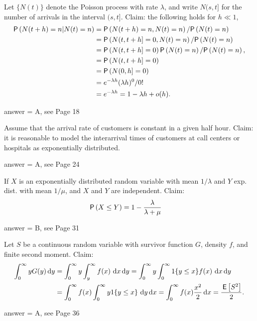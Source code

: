 \begin{exercise}[201807]{1}
Let $\{N(t)\}$ denote the Poisson process with rate $\lambda$, and write $N(s, t]$ for the number of arrivals in the interval $(s,t]$. Claim:  the following holds for $h\ll 1$, 
    \begin{align*}
  \P{N(t+h) = n | N(t) = n} 
&=  \P{N(t+h) = n, N(t) = n}/\P{N(t)=n} \\
&=  \P{N(t, t+h] = 0,  N(t) = n}/\P{N(t)=n} \\
&=  \P{N(t, t+h] = 0} \P{N(t) = n}/\P{N(t)=n}, \\
&= \P{N(t, t+h] = 0} \\
&= \P{N(0, h] = 0} \\
&= e^{-\lambda h} (\lambda h)^0/0! \\
&= e^{-\lambda h} = 1-\lambda h + o(h).
    \end{align*}
\begin{solution}
answer = A, see Page 18
\end{solution}
\end{exercise}



\begin{exercise}[201807]{1}
Assume that the arrival rate of customers is constant in a given half hour. Claim: it is reasonable to model the interarrival times of customers at call centers or hospitals as  exponentially distributed.
\begin{solution}
answer = A, see Page 24
\end{solution}
\end{exercise}

\begin{exercise}[201807]{1}
If $X$ is an exponentially distributed random variable with mean $1/\lambda$ and $Y$ exp. dist. with mean $1/\mu$, and $X$ and $Y$ are independent. Claim:
\begin{align*}
    \P{X\leq Y} 
&= 1 - \frac{\lambda}{\lambda + \mu} 
\end{align*}

\begin{solution}
answer = B, see Page 31
\end{solution}
\end{exercise}

\begin{exercise}[201807]{1}
Let $S$ be  a continuous random variable with survivor function $G$, density $f$, and finite second moment. Claim:
  \begin{align*}
\int_0^\infty y G(y) \,\text{d}y 
&=  \int_0^\infty y \int_y^\infty f(x)\, \,\text{d}x \,\text{d}y =  \int_0^\infty y \int_0^\infty 1\{y\leq x\}f(x)\, \,\text{d}x \,\text{d}y\\
&=  \int_0^\infty f(x) \int_0^\infty y 1\{y \leq x\}\, \,\text{d}y \,\text{d}x
=  \int_0^\infty f(x) \frac{x^2}2 \,\text{d}x =\frac{\,\mathsf{E}\left[S^2\right]}2.
  \end{align*}

\begin{solution}
answer = A, see Page 36
\end{solution}
\end{exercise}




